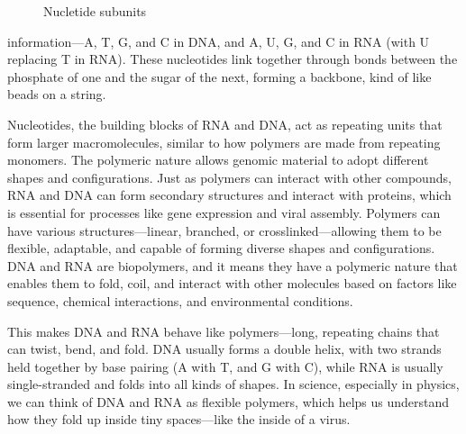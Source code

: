 \documentclass[12pt]{article}
\begin{document}
\begin{flushleft}
\begin{figure}[!ht]
  \centering
  

  \caption{Nucletide subunits}
\end{figure}


\noindent information—A, T, G, and C in DNA, and A, U, G, and C in RNA (with U replacing T in RNA). These nucleotides link together through bonds between the phosphate of one and the sugar of the next, forming a backbone, kind of like beads on a string. 





Nucleotides, the building blocks of RNA and DNA, act as repeating units  that form larger macromolecules, similar to how polymers are made from repeating monomers. The polymeric nature allows genomic material to adopt different shapes and configurations. Just as polymers can interact with other compounds, RNA and DNA can form secondary structures and interact with proteins, which is essential for processes like gene expression and viral assembly. Polymers can have various structures—linear, branched, or crosslinked—allowing them to be flexible, adaptable, and capable of forming diverse shapes and configurations.  DNA and RNA are biopolymers, and it means they have a polymeric nature that enables them to fold, coil, and interact with other molecules based on factors like sequence, chemical interactions, and environmental conditions.



This makes DNA and RNA behave like polymers—long, repeating chains that can twist, bend, and fold. DNA usually forms a double helix, with two strands held together by base pairing (A with T, and G with C), while RNA is usually single-stranded and folds into all kinds of shapes. In science, especially in physics, we can think of DNA and RNA as flexible polymers, which helps us understand how they fold up inside tiny spaces—like the inside of a virus.


\end{flushleft}
\end{document}
